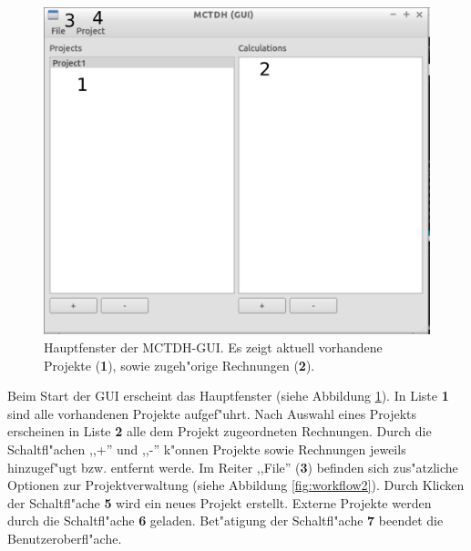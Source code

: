 \begin{figure}
    \centering
    \includegraphics[scale=0.5]{figures/screenMain}
    \caption{Hauptfenster der MCTDH-GUI. Es zeigt aktuell vorhandene Projekte (\textbf{1}), sowie zugeh"orige Rechnungen (\textbf{2}).}\label{fig:workflow1}
\end{figure}

Beim Start der GUI erscheint das Hauptfenster (siehe Abbildung \ref{fig:workflow1}).
In Liste \textbf{1} sind alle vorhandenen Projekte aufgef"uhrt.
Nach Auswahl eines Projekts erscheinen in Liste \textbf{2} alle dem Projekt zugeordneten Rechnungen.
Durch die Schaltfl"achen ,,+'' und ,,-'' k"onnen Projekte sowie Rechnungen jeweils hinzugef"ugt bzw.
entfernt werde.
Im Reiter ,,File'' (\textbf{3}) befinden sich zus"atzliche Optionen zur Projektverwaltung (siehe Abbildung \ref{fig:workflow2}).
Durch Klicken der Schaltfl"ache \textbf{5} wird ein neues Projekt erstellt. Externe Projekte werden durch die 
Schaltfl"ache \textbf{6} geladen. Bet"atigung der Schaltfl"ache \textbf{7} beendet die Benutzeroberfl"ache.

